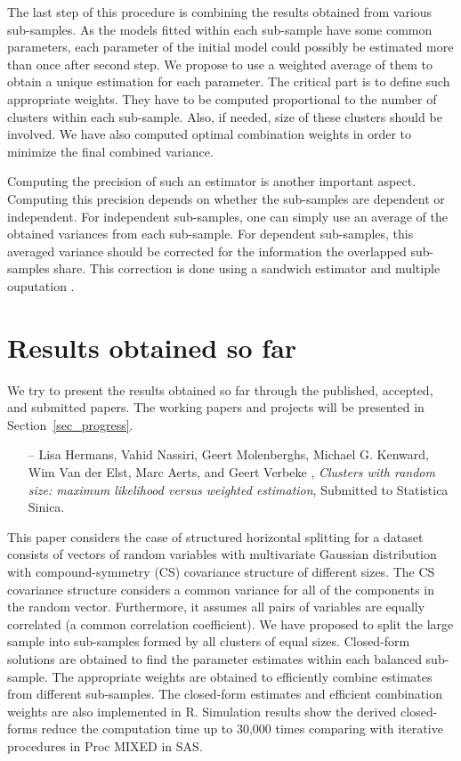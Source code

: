 \documentclass[14pt]{article}
\begin{document}
The last step of this procedure is combining the results obtained from various sub-samples. As the models fitted within each sub-sample have some common parameters, each parameter of the initial model could possibly be estimated more than once after second step. We propose to use a weighted average of them to obtain a unique estimation for each parameter. The critical part is to define such appropriate weights. They have to be computed proportional to the number of clusters within each sub-sample. Also, if needed, size of these clusters should be involved. We have also computed optimal combination weights in order to minimize the final combined variance.

Computing the precision of such an estimator is another important aspect. Computing this precision depends on whether the sub-samples are dependent or independent. For independent sub-samples, one can simply use an average of the obtained variances from each sub-sample. For dependent sub-samples, this averaged variance should be corrected for the information the overlapped sub-samples share. This correction is done using a sandwich estimator \citep{Verbeke2006, Verbeke2007} and multiple ouputation \citep{hoffman2001, follmann2003}.


\section{Results obtained so far}
\label{sec_results_so_far}
We try to present the results obtained so far through the published, accepted, and submitted papers. The working papers and projects will be presented in Section~\ref{sec_progress}.


\begin{itemize}
\item[--]{\textsf{Lisa Hermans, Vahid Nassiri, Geert Molenberghs, Michael G. Kenward, Wim Van der Elst, Marc Aerts, and Geert Verbeke}} , {\it Clusters with random size: maximum likelihood versus weighted estimation}, Submitted to Statistica Sinica.
\end{itemize}
This paper considers the case of structured horizontal splitting for a dataset consists of vectors of random variables with multivariate Gaussian distribution with compound-symmetry (CS) covariance structure of different sizes. The CS covariance structure considers a common variance for all of the components in the random vector. Furthermore, it assumes all pairs of variables are equally correlated (a common correlation coefficient). We have proposed to split the large sample into sub-samples formed by all clusters of equal sizes. Closed-form solutions are obtained to find the parameter estimates within each balanced sub-sample. The appropriate weights are obtained to efficiently combine estimates from different sub-samples. The closed-form estimates and efficient combination weights are also implemented in \textsf{R}. Simulation results show the derived closed-forms reduce the computation time up to 30,000 times comparing with iterative procedures in \textsf{Proc MIXED} in \textsf{SAS}.
\end{document}
